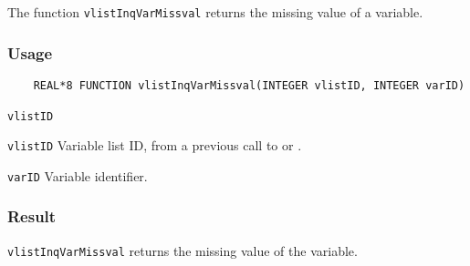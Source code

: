 The function {\texttt{vlistInqVarMissval}} returns the missing value of a variable.

\subsubsection*{Usage}

\begin{verbatim}
    REAL*8 FUNCTION vlistInqVarMissval(INTEGER vlistID, INTEGER varID)
\end{verbatim}

\hspace*{4mm}\begin{minipage}[]{15cm}
\begin{deflist}{\texttt{vlistID}\ }
\item[\texttt{vlistID}]
Variable list ID, from a previous call to {} or {}.
\item[\texttt{varID}]
Variable identifier.

\end{deflist}
\end{minipage}

\subsubsection*{Result}

{\texttt{vlistInqVarMissval}} returns the missing value of the variable.

